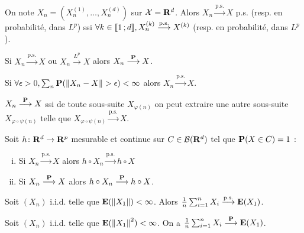 	\begin{pop}
		On note $X_n = \left( X_n^{(1)},\ldots,X_n^{(d)} \right)$ sur $\mathcal{X} = \mathbf{R}^d$.
		Alors $X_n \overset{\text{p.s.}}{\longrightarrow} X$ p.s. (resp. en probabilité, dans $L^p$) ssi $\forall k \in \mathopen{[\![}1\mathclose{}\mathpunct{};d\mathclose{]\!]}, X_n^{(k)} \overset{\text{p.s.}}{\longrightarrow} X^{(k)}$ (resp. en probabilité, dans $L^p$).
	\end{pop}

	\begin{pop}
		Si $X_n \overset{\text{p.s.}}{\longrightarrow} X$ ou $X_n \overset{L^p}{\longrightarrow} X$ alors $X_n \overset{\mathbf{P}}{\longrightarrow} X$.
	\end{pop}

	\begin{pop}
		Si $\forall \epsilon > 0, \sum_n \mathbf{P}(\left\lVert X_n - X\right\rVert > \epsilon) < \infty$ alors $X_n \overset{\text{p.s.}}{\longrightarrow} X$.
	\end{pop}

	\begin{pop}
		$X_n \overset{\mathbf{P}}{\longrightarrow} X$ ssi de toute sous-suite $X_{\varphi(n)}$ on peut extraire une autre sous-suite $X_{\varphi \circ \psi(n)}$ telle que $X_{\varphi \circ \psi(n)} \overset{\text{p.s.}}{\longrightarrow} X$.
	\end{pop}

	\begin{thm}
		Soit $h \colon \mathbf{R}^d \to \mathbf{R}^p$ mesurable et continue sur $C \in \mathcal{B}(\mathbf{R}^d)$ tel que $\mathbf{P}(X \in C) = 1$ :
		\begin{enumerate}[(i)]
			\item Si $X_n \overset{\text{p.s.}}{\longrightarrow} X$ alors $h \circ X_n \overset{\text{p.s.}}{\longrightarrow} h \circ X$
			\item Si $X_n \overset{\mathbf{P}}{\longrightarrow} X$ alors $h \circ X_n \overset{\mathbf{P}}{\longrightarrow} h \circ X$.
		\end{enumerate}
	\end{thm}

	\begin{thm}
		Soit $(X_n)$ i.i.d. telle que $\mathbf{E}(\left\lVert X_1\right\rVert) < \infty$.
		Alors $\frac{1}{n} \sum_{i = 1}^n X_i \overset{\text{p.s.}}{\longrightarrow} \mathbf{E}(X_1)$.
	\end{thm}

	\begin{thm}
		Soit $(X_n)$ i.i.d. telle que $\mathbf{E}(\left\lVert X_1\right\rVert^2) < \infty$.
		On a $\frac{1}{n} \sum_{i = 1}^n X_i \overset{\mathbf{P}}{\longrightarrow} \mathbf{E}(X_1)$.
	\end{thm}
